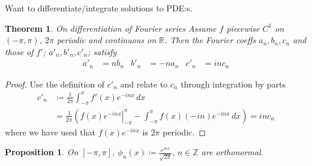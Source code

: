 \documentclass{article}
\newtheorem{theorem}{Theorem}
\newtheorem{proposition}{Proposition}
\begin{document}
Want to differentiate/integrate solutions to PDE:s.

\begin{theorem}{On differentiation of Fourier series}
	Assume $f$ piecewise $C^1$ on $(-\pi, \pi)$, $2\pi$ periodic and continuous on $\mathbb R$.
	Then the Fourier coeffs $a_n, b_n, c_n$ and those of $f'$; $a'_n, b'_n, c'_n$; satisfy
	\begin{align*}
		a'_n &= n b_n & b'_n &= -n a_n & c'_n &= in c_n
	\end{align*}
\end{theorem}
\begin{proof}
	Use the definition of $c'_n$ and relate to $c_n$ through integration by parts
	\begin{align*}
		c'_n &\coloneqq \frac1{2\pi} \int_{-\pi}^\pi f'(x) e^{-inx} \, dx \\
		&= \frac1{2\pi} \left( \left. f(x) e^{-inx} \right\rvert_{-\pi}^\pi - \int_{-\pi}^\pi f(x) (-in) e^{-inx} \, dx \right) = in c_n
	\end{align*}
	where we have used that $f(x) e^{-inx}$ is $2\pi$ periodic.
\end{proof}

\begin{proposition}
	On $[-\pi, \pi]$, $\phi_n(x) \coloneqq \frac{e^{inx}}{\sqrt{2\pi}}, \, n \in \mathbb Z$ are orthonormal.
\end{proposition}
\end{document}
